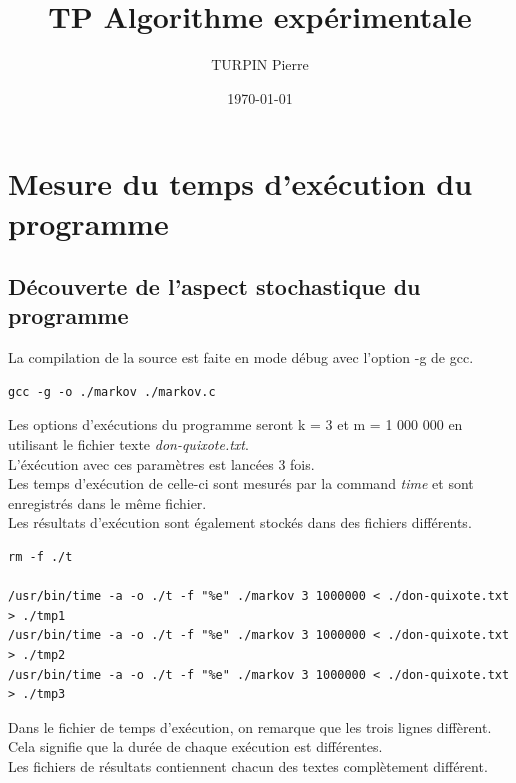 \documentclass[10pt, a4paper]{article}
\def \DocumentTitle {TP Algorithme expérimentale}
\begin{document}
\title{\DocumentTitle}
\author{
    TURPIN Pierre
}
\date{\today}
\maketitle \newpage
\tableofcontents \newpage

\section{Mesure du temps d'exécution du programme}

\subsection{Découverte de l'aspect stochastique du programme}

La compilation de la source est faite en mode débug avec l'option -g de gcc. \\

\begin{verbatim}
gcc -g -o ./markov ./markov.c
\end{verbatim}

Les options d'exécutions du programme seront k = 3 et m = 1 000 000 en
utilisant le fichier texte \emph{don-quixote.txt}. \\

L'éxécution avec ces paramètres est lancées 3 fois. \\
Les temps d'exécution de celle-ci sont mesurés par la command \emph{time} et
sont enregistrés dans le même fichier. \\
Les résultats d'exécution sont également stockés dans des fichiers différents. \\


\begin{verbatim}
rm -f ./t

/usr/bin/time -a -o ./t -f "%e" ./markov 3 1000000 < ./don-quixote.txt > ./tmp1
/usr/bin/time -a -o ./t -f "%e" ./markov 3 1000000 < ./don-quixote.txt > ./tmp2
/usr/bin/time -a -o ./t -f "%e" ./markov 3 1000000 < ./don-quixote.txt > ./tmp3
\end{verbatim}

Dans le fichier de temps d'exécution, on remarque que les trois lignes
diffèrent. Cela signifie que la durée de chaque exécution est différentes. \\

Les fichiers de résultats contiennent chacun des textes complètement différent. \\
\end{document}
